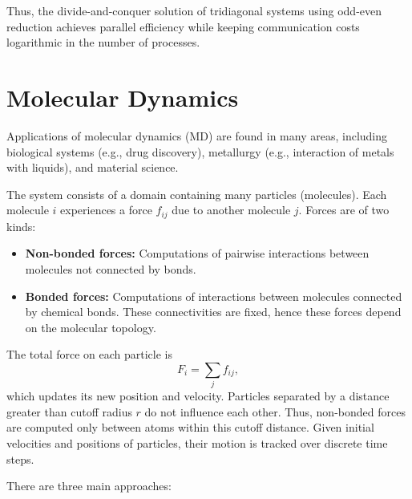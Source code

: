 \documentclass[12pt]{book}
\begin{document}
Thus, the divide-and-conquer solution of tridiagonal systems using odd-even reduction achieves parallel efficiency while keeping communication costs logarithmic in the number of processes.














\section{Molecular Dynamics}
Applications of molecular dynamics (MD) are found in many areas, including biological systems (e.g., drug discovery), metallurgy (e.g., interaction of metals with liquids), and material science.  

The system consists of a domain containing many particles (molecules). Each molecule $i$ experiences a force $f_{ij}$ due to another molecule $j$. Forces are of two kinds:  
\begin{itemize}
    \item \textbf{Non-bonded forces:} Computations of pairwise interactions between molecules not connected by bonds.
    \item \textbf{Bonded forces:} Computations of interactions between molecules connected by chemical bonds. These connectivities are fixed, hence these forces depend on the molecular topology.
\end{itemize}

The total force on each particle is
\[
F_i = \sum_j f_{ij},
\]
which updates its new position and velocity. Particles separated by a distance greater than cutoff radius $r$ do not influence each other. Thus, non-bonded forces are computed only between atoms within this cutoff distance. Given initial velocities and positions of particles, their motion is tracked over discrete time steps.

There are three main approaches:
\end{document}
